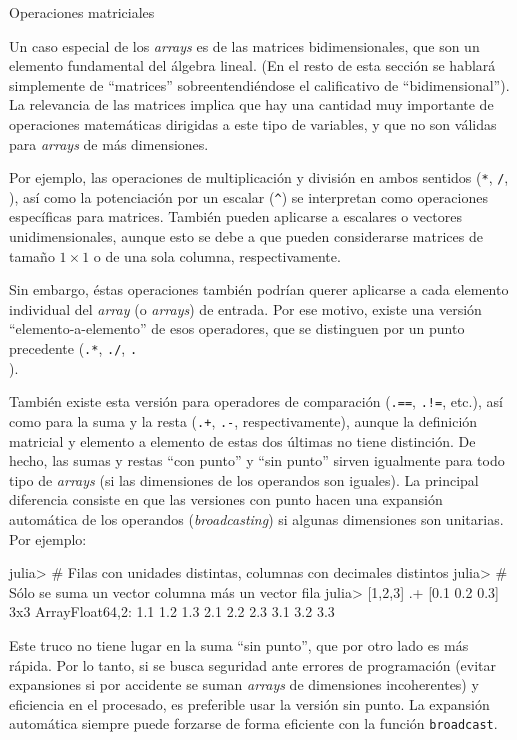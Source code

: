 ﻿\documentclass{article}
\newcommand{\code}{\texttt}
\begin{document}
Operaciones matriciales

Un caso especial de los \emph{arrays} es de las matrices bidimensionales, que son un elemento fundamental del álgebra lineal. (En el resto de esta sección se hablará simplemente de ``matrices'' sobreentendiéndose el calificativo de ``bidimensional''). La relevancia de las matrices implica que hay una cantidad muy importante de operaciones matemáticas dirigidas a este tipo de variables, y que no son válidas para \emph{arrays} de más dimensiones.

Por ejemplo, las operaciones de multiplicación y división en ambos sentidos (\code{*}, \code{/}, \code{\\} ), así como la potenciación por un escalar (\code{^}) se interpretan como operaciones específicas para matrices. También pueden aplicarse a escalares o vectores unidimensionales, aunque esto se debe a que pueden considerarse matrices de tamaño $1\times{}1$ o de una sola columna, respectivamente.

Sin embargo, éstas operaciones también podrían querer aplicarse a cada elemento individual del \emph{array} (o \emph{arrays}) de entrada. Por ese motivo, existe una versión ``elemento-a-elemento'' de esos operadores, que se distinguen por un punto precedente (\code{.*}, \code{./}, \code{.\\}).

También existe esta versión para operadores de comparación (\code{.==}, \code{.!=}, etc.), así como para  la suma y la resta (\code{.+}, \code{.-}, respectivamente), aunque la definición matricial y elemento a elemento de estas dos últimas no tiene distinción. De hecho, las sumas y restas ``con punto'' y ``sin punto'' sirven igualmente para todo tipo de \emph{arrays} (si las dimensiones de los operandos son iguales). La principal diferencia consiste en que las versiones con punto hacen una expansión automática de los operandos (\emph{broadcasting}) si algunas dimensiones son unitarias. Por ejemplo:

julia> # Filas con unidades distintas, columnas con decimales distintos
julia> # Sólo se suma un vector columna más un vector fila
julia> [1,2,3] .+ [0.1 0.2 0.3]
3x3 Array{Float64,2}:
 1.1 1.2 1.3
 2.1 2.2 2.3
 3.1 3.2 3.3

Este truco no tiene lugar en la suma ``sin punto'', que por otro lado es más rápida. Por lo tanto, si se busca seguridad ante errores de programación (evitar expansiones si por accidente se suman \emph{arrays} de dimensiones incoherentes) y eficiencia en el procesado, es preferible usar la versión sin punto. La expansión automática siempre puede forzarse de forma eficiente con la función \code{broadcast}.
\end{document}
